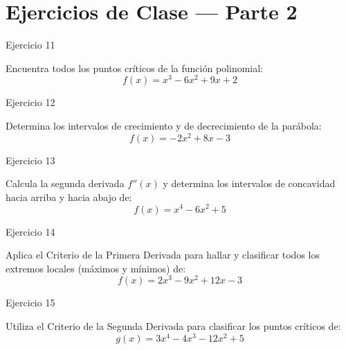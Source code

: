 \documentclass[aspectratio=169]{beamer}
\begin{document}
\section{Ejercicios de Clase — Parte 2}

\begin{frame}{Ejercicio 11}
  \begin{mwejercicio}
    Encuentra todos los puntos críticos de la función polinomial:
    $$f(x) = x^3 - 6x^2 + 9x + 2$$
  \end{mwejercicio}
  \vspace{3.5cm}
\end{frame}
\begin{frame}{Ejercicio 12}
  \begin{mwejercicio}
    Determina los intervalos de crecimiento y de decrecimiento de la parábola:
    $$f(x) = -2x^2 + 8x - 3$$
  \end{mwejercicio}
  \vspace{3.5cm}
\end{frame}
\begin{frame}{Ejercicio 13}
  \begin{mwejercicio}
    Calcula la segunda derivada $f''(x)$ y determina los intervalos de concavidad hacia arriba y hacia abajo de:
    $$f(x) = x^4 - 6x^2 + 5$$
  \end{mwejercicio}
  \vspace{3.5cm}
\end{frame}
\begin{frame}{Ejercicio 14}
  \begin{mwejercicio}
    Aplica el Criterio de la Primera Derivada para hallar y clasificar todos los extremos locales (máximos y mínimos) de:
    $$f(x) = 2x^3 - 9x^2 + 12x - 3$$
  \end{mwejercicio}
  \vspace{3.5cm}
\end{frame}
\begin{frame}{Ejercicio 15}
  \begin{mwejercicio}
    Utiliza el Criterio de la Segunda Derivada para clasificar los puntos críticos de:
    $$g(x) = 3x^4 - 4x^3 - 12x^2 + 5$$
  \end{mwejercicio}
  \vspace{3.5cm}
\end{frame}
\end{document}
